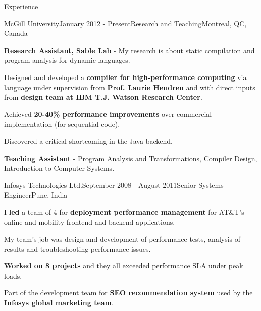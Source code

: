 \documentclass{resume} %
\begin{document}
\begin{rSection}{Experience}
\begin{rSubsection}{McGill University}{January 2012 - Present}{Research and Teaching}{Montreal, QC, Canada}
\item \textbf{Research Assistant, Sable Lab} - My research is about static compilation and program analysis for dynamic languages.
\begin{lsubSubsection}
	\item Designed and developed a \textbf{\matlab compiler for high-performance computing} via \xten language under supervision from \textbf{Prof. Laurie Hendren} and with direct inputs from \textbf{\xten design team at IBM T.J. Watson Research Center}.
	\item Achieved \textbf{20-40\% performance improvements} over commercial \matlab implementation (for sequential code).
	\item Discovered a critical shortcoming in the \xten Java backend.
\end{lsubSubsection}
\item \textbf{Teaching Assistant} - Program Analysis and Transformations,
	Compiler Design, Introduction to Computer Systems.
\end{rSubsection}

\begin{rSubsection}{Infosys Technologies Ltd.}{September 2008 - August 2011}{Senior Systems Engineer}{Pune, India}
\item I \textbf{led} a team of 4 for \textbf{deployment performance management} for AT\&T's online and mobility frontend and backend applications.
\begin{lsubSubsection}
\item My team's job was design and development of performance tests, analysis of results and troubleshooting performance issues.
\item \textbf{Worked on 8 projects} and they all exceeded performance SLA under peak loads.
\end{lsubSubsection}
\item Part of the development team for \textbf{SEO recommendation system} used by the \textbf{Infosys global marketing team}.
\end{rSubsection}


\end{rSection}
\end{document}
